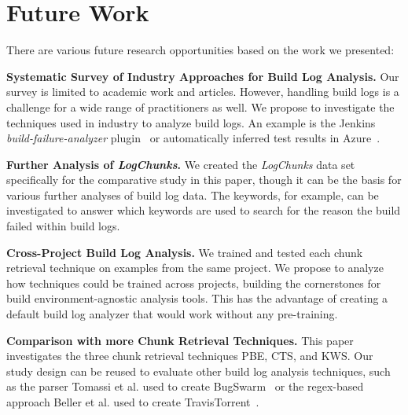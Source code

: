 \section{Future Work}

There are various future research opportunities based on the
work we presented:

\textbf{Systematic Survey of Industry Approaches for Build
Log Analysis.}
Our survey is limited to academic work and articles.
However, handling build logs is a challenge for a wide range of
practitioners as well.
We propose to investigate the techniques used in industry to analyze
build logs.
An example is the Jenkins \emph{build-failure-analyzer}
plugin~\cite{jenkins2020failure-analyzer} or automatically
inferred test results in Azure~\cite{azure2020inferred}.

\textbf{Further Analysis of \emph{LogChunks}.}
We created the
\emph{LogChunks} data set \cite{brandt2020logchunks} specifically for
the comparative
study in this paper, though it can be the basis for various further
analyses of build log data.
The keywords, for example, can be
investigated to answer which keywords are used to search for the
reason the build failed within build logs.

\textbf{Cross-Project Build Log Analysis.}
We trained and
tested each chunk retrieval technique on examples from the same
project.
We propose to analyze how techniques could be trained
across projects, building the cornerstones for build
environment-agnostic analysis tools.
This has the advantage of creating
a default build log analyzer that would work without any pre-training.

\textbf{Comparison with more Chunk Retrieval Techniques.}
This
paper investigates the three chunk retrieval techniques PBE, CTS, and
KWS\@.
Our study design can be reused to evaluate other build log
analysis techniques, such as the parser Tomassi et al.
used to create
BugSwarm~\cite{tomassi2019bugswarm} or the regex-based approach
Beller et al.
used to create TravisTorrent~\cite{beller2017oops}.

